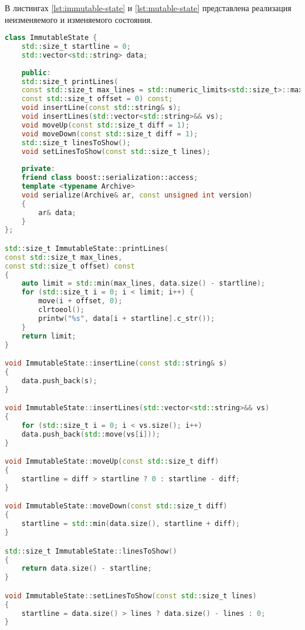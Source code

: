 В листингах \ref{lst:immutable-state} и \ref{lst:mutable-state} представлена реализация неизменяемого и изменяемого состояния.\\

\begin{lstlisting}[label=lst:immutable-state,caption=Класс\, описывающий неизменяемое состояние системы,language=c++]
class ImmutableState {
	std::size_t startline = 0;
	std::vector<std::string> data;
	
	public:
	std::size_t printLines(
	const std::size_t max_lines = std::numeric_limits<std::size_t>::max(),
	const std::size_t offset = 0) const;
	void insertLine(const std::string& s);
	void insertLines(std::vector<std::string>&& vs);
	void moveUp(const std::size_t diff = 1);
	void moveDown(const std::size_t diff = 1);
	std::size_t linesToShow();
	void setLinesToShow(const std::size_t lines);
	
	private:
	friend class boost::serialization::access;
	template <typename Archive>
	void serialize(Archive& ar, const unsigned int version)
	{
		ar& data;
	}
};

std::size_t ImmutableState::printLines(
const std::size_t max_lines,
const std::size_t offset) const
{
	auto limit = std::min(max_lines, data.size() - startline);
	for (std::size_t i = 0; i < limit; i++) {
		move(i + offset, 0);
		clrtoeol();
		printw("%s", data[i + startline].c_str());
	}
	return limit;
}

void ImmutableState::insertLine(const std::string& s)
{
	data.push_back(s);
}

void ImmutableState::insertLines(std::vector<std::string>&& vs)
{
	for (std::size_t i = 0; i < vs.size(); i++)
	data.push_back(std::move(vs[i]));
}

void ImmutableState::moveUp(const std::size_t diff)
{
	startline = diff > startline ? 0 : startline - diff;
}

void ImmutableState::moveDown(const std::size_t diff)
{
	startline = std::min(data.size(), startline + diff);
}

std::size_t ImmutableState::linesToShow()
{
	return data.size() - startline;
}

void ImmutableState::setLinesToShow(const std::size_t lines)
{
	startline = data.size() > lines ? data.size() - lines : 0;
}
\end{lstlisting}

